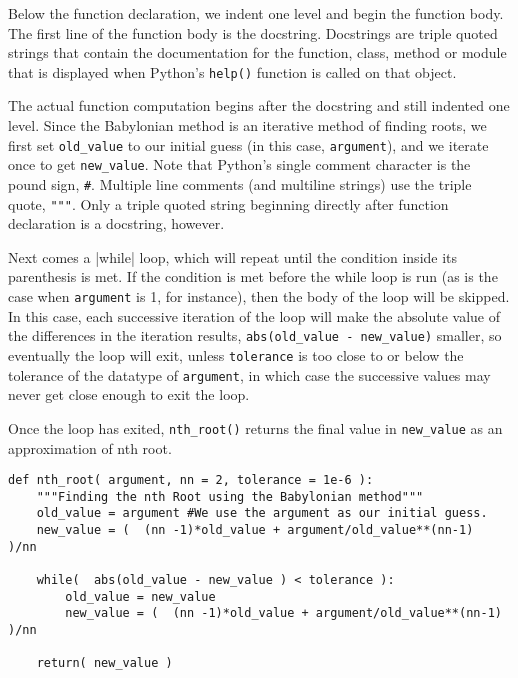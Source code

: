 Below the function declaration, we indent one level and begin the function body. The first line of the function body is the \gls{docstring}. Docstrings are triple quoted strings that contain the documentation for the function, class, method or module that is displayed when Python's \verb|help()| function is called on that object.

The actual function computation begins after the docstring and still indented one level. Since the Babylonian method is an iterative method of finding roots, we first set \verb|old_value| to our initial guess (in this case, \verb|argument|), and we iterate once to get \verb|new_value|. Note that Python's single comment character is the pound sign, \verb|#|. Multiple line comments (and multiline strings) use the triple quote, \verb|"""|. Only a triple quoted string beginning directly after function declaration is a docstring, however.

Next comes a |while| loop, which will repeat until the condition inside its parenthesis is met. If the condition is met before the while loop is run (as is the case when \verb|argument| is 1, for instance), then the body of the loop will be skipped. In this case, each successive iteration of the loop will make the absolute value of the differences in the iteration results, \verb|abs(old_value - new_value)| smaller, so eventually the loop will exit, unless \verb|tolerance| is too close to or below the tolerance of the datatype of \verb|argument|, in which case the successive values may never get close enough to exit the loop. 

Once the loop has exited, \verb|nth_root()| returns the final value in \verb|new_value| as an approximation of nth root.

\begin{lstlisting}[caption=Nth root function,
  label=nthrootfunction,
  float=h!]
def nth_root( argument, nn = 2, tolerance = 1e-6 ):
    """Finding the nth Root using the Babylonian method"""
    old_value = argument #We use the argument as our initial guess.
    new_value = (  (nn -1)*old_value + argument/old_value**(nn-1)  )/nn

    while(  abs(old_value - new_value ) < tolerance ):
        old_value = new_value
        new_value = (  (nn -1)*old_value + argument/old_value**(nn-1)  )/nn

    return( new_value )

\end{lstlisting}


